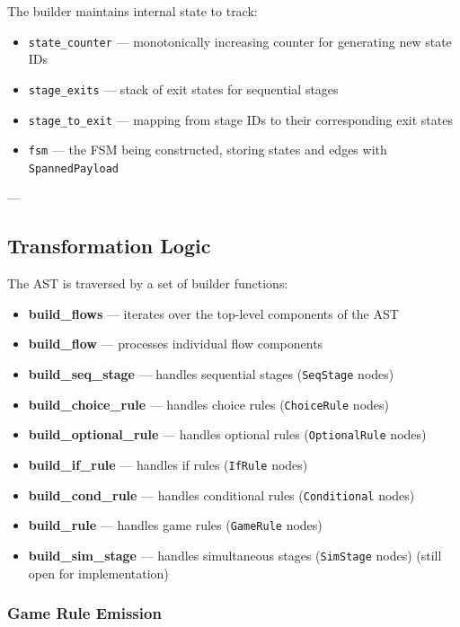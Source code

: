 \documentclass[a4paper,11pt]{article}
\begin{document}
The builder maintains internal state to track:

\begin{itemize}
    \item \texttt{state\_counter} — monotonically increasing counter for generating new state IDs
    \item \texttt{stage\_exits} — stack of exit states for sequential stages
    \item \texttt{stage\_to\_exit} — mapping from stage IDs to their corresponding exit states
    \item \texttt{fsm} — the FSM being constructed, storing states and edges with \texttt{SpannedPayload}
\end{itemize}

---

\subsection{Transformation Logic}

The AST is traversed by a set of builder functions:

\begin{itemize}
    \item \textbf{build\_flows} — iterates over the top-level components of the AST
    \item \textbf{build\_flow} — processes individual flow components
    \item \textbf{build\_seq\_stage} — handles sequential stages (\texttt{SeqStage} nodes)
    \item \textbf{build\_choice\_rule} — handles choice rules (\texttt{ChoiceRule} nodes)
    \item \textbf{build\_optional\_rule} — handles optional rules (\texttt{OptionalRule} nodes)
    \item \textbf{build\_if\_rule} — handles if rules (\texttt{IfRule} nodes)
    \item \textbf{build\_cond\_rule} — handles conditional rules (\texttt{Conditional} nodes)
    \item \textbf{build\_rule} — handles game rules (\texttt{GameRule} nodes)
    \item \textbf{build\_sim\_stage} — handles simultaneous stages (\texttt{SimStage} nodes) (still open for implementation)
\end{itemize}

\subsubsection{Game Rule Emission}
\end{document}
